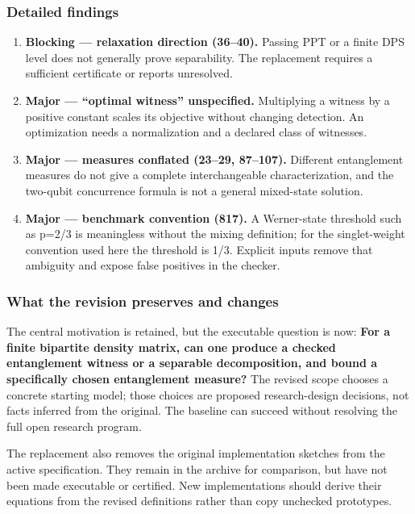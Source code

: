\documentclass[
  11pt,
]{article}
\begin{document}
\subsubsection{Detailed findings}

\begin{enumerate}
\def\labelenumi{\arabic{enumi}.}
\item
  \textbf{Blocking --- relaxation direction (36--40).} Passing PPT or a
  finite DPS level does not generally prove separability. The
  replacement requires a sufficient certificate or reports unresolved.
\item
  \textbf{Major --- ``optimal witness'' unspecified.} Multiplying a
  witness by a positive constant scales its objective without changing
  detection. An optimization needs a normalization and a declared class
  of witnesses.
\item
  \textbf{Major --- measures conflated (23--29, 87--107).} Different
  entanglement measures do not give a complete interchangeable
  characterization, and the two-qubit concurrence formula is not a
  general mixed-state solution.
\item
  \textbf{Major --- benchmark convention (817).} A Werner-state
  threshold such as p=2/3 is meaningless without the mixing definition;
  for the singlet-weight convention used here the threshold is 1/3.
  Explicit inputs remove that ambiguity and expose false positives in
  the checker.
\end{enumerate}

\subsubsection{What the revision preserves and changes}

The central motivation is retained, but the executable question is now:
\textbf{For a finite bipartite density matrix, can one produce a checked
entanglement witness or a separable decomposition, and bound a
specifically chosen entanglement measure?} The revised scope chooses a
concrete starting model; those choices are proposed research-design
decisions, not facts inferred from the original. The baseline can
succeed without resolving the full open research program.

The replacement also removes the original implementation sketches from
the active specification. They remain in the archive for comparison, but
have not been made executable or certified. New implementations should
derive their equations from the revised definitions rather than copy
unchecked prototypes.
\end{document}
